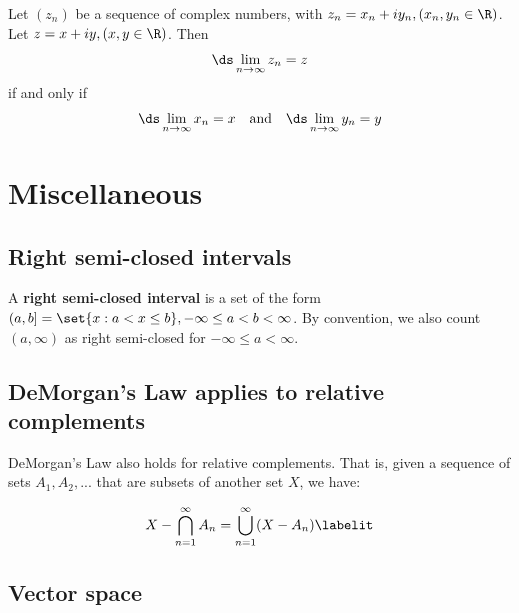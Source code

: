 \documentclass{article} %
\begin{document}
\begin{lemma}
\cite[Lemma~3.2]{stewart2018complex} Let $(z_n)$ be a sequence of complex numbers, with $z_n = x_n + i y_n, (x_n, y_n \in \R)$.  Let $z=x+iy, 	(x, y \in \R)$.  Then 
\[ \ds\lim_{n \to \infty} z_n = z\]
if and only if 
\[ \ds\lim_{n \to \infty} x_n = x \quad \text{and} \quad \ds\lim_{n \to \infty} y_n = y\]
\end{lemma}







\section{Miscellaneous}
\subsection{Right semi-closed intervals}
\begin{definition}
A \textbf{right semi-closed interval} is a set of the form $(a,b] = \set{x : a < x \leq b}, -\infty \leq a < b < \infty$.  By convention, we also count $(a,\infty)$ as right semi-closed for $-\infty \leq a < \infty$. 
\label{def:rsc_intervals}
\end{definition}

\subsection{DeMorgan's Law applies to relative complements} 

\begin{remark}
DeMorgan's Law also holds for relative complements.  That is, given a sequence of sets $A_1, A_2, ...$ that are subsets of another set $X$, we have:

\begin{align*}
X - \bigcap_{n=1}^\infty A_n = \bigcup_{n=1}^\infty (X - A_n)
\labelit \label{eqn:demorgan_for_relative_complements}	
\end{align*}
\end{remark}

\subsection{Vector space} \label{sec:vector_space}
\end{document}
